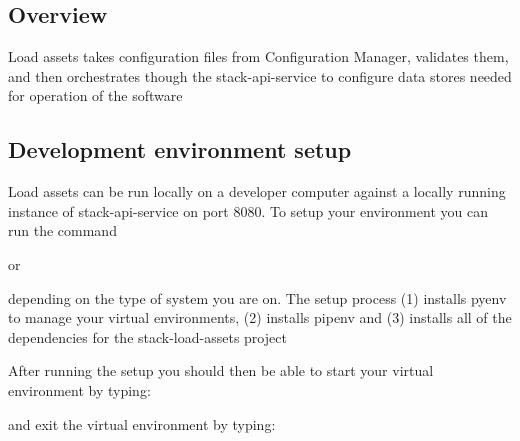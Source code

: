 \hypertarget{overview}{%
\subsection{Overview}\label{overview}}

Load assets takes configuration files from Configuration Manager,
validates them, and then orchestrates though the stack-api-service to
configure data stores needed for operation of the software

\hypertarget{development-environment-setup}{%
\subsection{Development environment
setup}\label{development-environment-setup}}

Load assets can be run locally on a developer computer against a locally
running instance of stack-api-service on port 8080. To setup your
environment you can run the command

\begin{Shaded}
\begin{Highlighting}[]
\end{Highlighting}
\end{Shaded}

or

\begin{Shaded}
\begin{Highlighting}[]
\end{Highlighting}
\end{Shaded}

depending on the type of system you are on. The setup process (1)
installs pyenv to manage your virtual environments, (2) installs pipenv
and (3) installs all of the dependencies for the stack-load-assets
project

After running the setup you should then be able to start your virtual
environment by typing:

\begin{Shaded}
\begin{Highlighting}[]
\end{Highlighting}
\end{Shaded}

and exit the virtual environment by typing:

\begin{Shaded}
\begin{Highlighting}[]
\end{Highlighting}
\end{Shaded}

